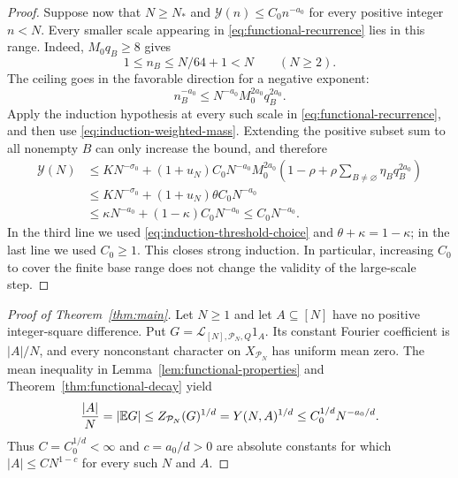 \begin{proof}
Suppose now that $N\ge N_*$ and
$\mathcal Y(n)\le C_0n^{-a_0}$ for every positive integer $n<N$.
Every smaller scale appearing in \eqref{eq:functional-recurrence} lies in
this range.  Indeed, $M_0q_B\ge8$ gives
\[
 1\le n_B\le N/64+1<N\qquad(N\ge2).
\]
The ceiling goes in the favorable direction for a negative exponent:
\[
 n_B^{-a_0}
 \le N^{-a_0}M_0^{2a_0}q_B^{2a_0}.
\]
Apply the induction hypothesis at every such scale in
\eqref{eq:functional-recurrence}, and then use
\eqref{eq:induction-weighted-mass}.  Extending the positive subset sum to all
nonempty $B$ can only increase the bound, and therefore
\begin{align*}
 \mathcal Y(N)
 &\le K N^{-\sigma_0}
 +(1+u_N)C_0N^{-a_0}M_0^{2a_0}
       \left(1-\rho+\rho
           \sum_{B\ne\varnothing}\eta_Bq_B^{2a_0}\right)\\
 &\le K N^{-\sigma_0}+(1+u_N)\theta C_0N^{-a_0}\\
 &\le \kappa N^{-a_0}+(1-\kappa)C_0N^{-a_0}
 \le C_0N^{-a_0}.
\end{align*}
In the third line we used
\eqref{eq:induction-threshold-choice} and
$\theta+\kappa=1-\kappa$; in the last line we used $C_0\ge1$.
This closes strong induction.  In particular, increasing $C_0$ to cover the
finite base range does not change the validity of the large-scale step.
\end{proof}

\begin{proof}[Proof of Theorem~\ref{thm:main}]
Let $N\ge1$ and let $A\subseteq[N]$ have no positive integer-square
difference.  Put
$G=\mathcal L_{[N],\mathcal P_N,Q}1_A$.  Its constant Fourier coefficient is
$|A|/N$, and every nonconstant character on $X_{\mathcal P_N}$ has uniform
mean zero.  The mean inequality in Lemma~\ref{lem:functional-properties} and
Theorem~\ref{thm:functional-decay} yield
\[
 \frac{|A|}{N}=|\mathbb E G|
 \le Z_{\mathcal P_N}(G)^{1/d}
 =Y(N,A)^{1/d}
 \le C_0^{1/d}N^{-a_0/d}.
\]
Thus $C=C_0^{1/d}<\infty$ and $c=a_0/d>0$ are absolute constants for which
$|A|\le CN^{1-c}$ for every such $N$ and $A$.
\end{proof}

